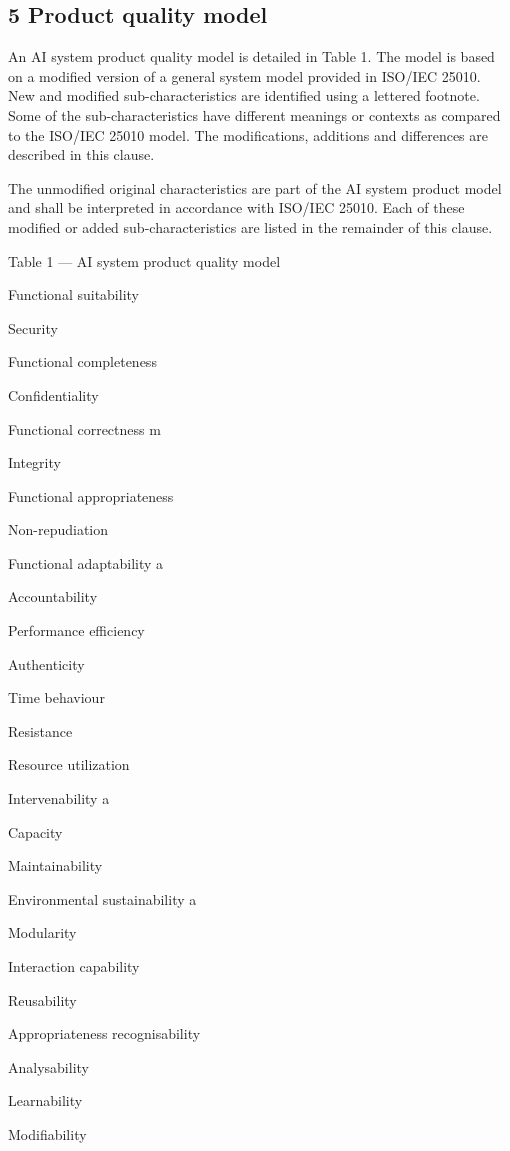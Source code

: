 \documentclass[
  letterpaper,
  DIV=11,
  numbers=noendperiod,
  oneside]{scrreprt}
\begin{document}
\begin{tcolorbox}
\section{5 Product quality model}\label{product-quality-model}

An AI system product quality model is detailed in Table 1. The model is
based on a modified version of a general system model provided in
ISO/IEC 25010. New and modified sub-characteristics are identified using
a lettered footnote. Some of the sub-characteristics have different
meanings or contexts as compared to the ISO/IEC 25010 model. The
modifications, additions and differences are described in this clause.

The unmodified original characteristics are part of the AI system
product model and shall be interpreted in accordance with ISO/IEC 25010.
Each of these modified or added sub-characteristics are listed in the
remainder of this clause.

Table 1 --- AI system product quality model

Functional suitability

Security

Functional completeness

Confidentiality

Functional correctness m

Integrity

Functional appropriateness

Non-repudiation

Functional adaptability a

Accountability

Performance efficiency

Authenticity

Time behaviour

Resistance

Resource utilization

Intervenability a

Capacity

Maintainability

Environmental sustainability a

Modularity

Interaction capability

Reusability

Appropriateness recognisability

Analysability

Learnability

Modifiability


\end{tcolorbox}
\end{document}
